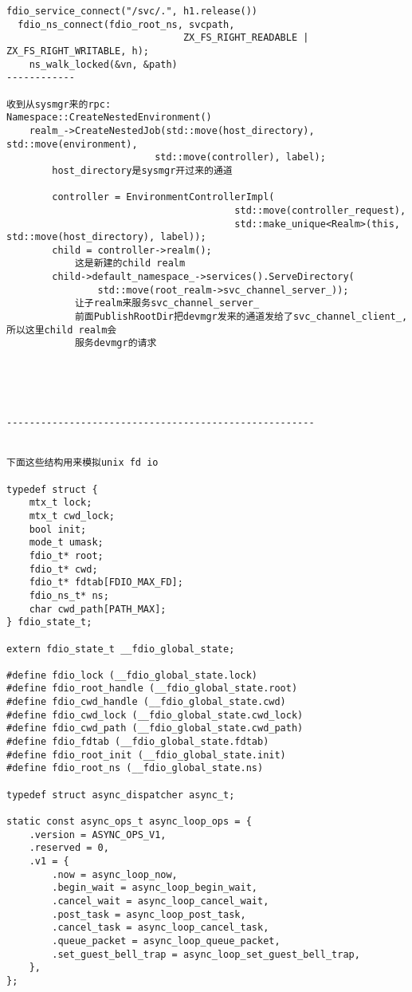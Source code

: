 \begin{verbatim}
fdio_service_connect("/svc/.", h1.release())
  fdio_ns_connect(fdio_root_ns, svcpath,
                               ZX_FS_RIGHT_READABLE | ZX_FS_RIGHT_WRITABLE, h);
    ns_walk_locked(&vn, &path)       
------------

收到从sysmgr来的rpc:
Namespace::CreateNestedEnvironment()
    realm_->CreateNestedJob(std::move(host_directory), std::move(environment),
                          std::move(controller), label);
        host_directory是sysmgr开过来的通道

        controller = EnvironmentControllerImpl(
                                        std::move(controller_request),
                                        std::make_unique<Realm>(this, std::move(host_directory), label));
        child = controller->realm();
            这是新建的child realm
        child->default_namespace_->services().ServeDirectory(
                std::move(root_realm->svc_channel_server_));
            让子realm来服务svc_channel_server_
            前面PublishRootDir把devmgr发来的通道发给了svc_channel_client_, 所以这里child realm会
            服务devmgr的请求





------------------------------------------------------


下面这些结构用来模拟unix fd io

typedef struct {
    mtx_t lock;
    mtx_t cwd_lock;
    bool init;
    mode_t umask;
    fdio_t* root;
    fdio_t* cwd;
    fdio_t* fdtab[FDIO_MAX_FD];
    fdio_ns_t* ns;
    char cwd_path[PATH_MAX];
} fdio_state_t;

extern fdio_state_t __fdio_global_state;

#define fdio_lock (__fdio_global_state.lock)
#define fdio_root_handle (__fdio_global_state.root)
#define fdio_cwd_handle (__fdio_global_state.cwd)
#define fdio_cwd_lock (__fdio_global_state.cwd_lock)
#define fdio_cwd_path (__fdio_global_state.cwd_path)
#define fdio_fdtab (__fdio_global_state.fdtab)
#define fdio_root_init (__fdio_global_state.init)
#define fdio_root_ns (__fdio_global_state.ns)

typedef struct async_dispatcher async_t;

static const async_ops_t async_loop_ops = {
    .version = ASYNC_OPS_V1,
    .reserved = 0,
    .v1 = {
        .now = async_loop_now,
        .begin_wait = async_loop_begin_wait,
        .cancel_wait = async_loop_cancel_wait,
        .post_task = async_loop_post_task,
        .cancel_task = async_loop_cancel_task,
        .queue_packet = async_loop_queue_packet,
        .set_guest_bell_trap = async_loop_set_guest_bell_trap,
    },
};

\end{verbatim}
